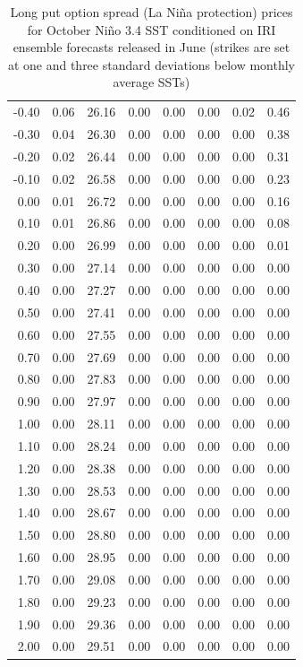 \documentclass[article]{jss}
\begin{document}
\begin{table}[!htbp]
\begin{tabular}{rrrrrrrr}
  -0.40 & 0.06 & 26.16 & 0.00 & 0.00 & 0.00 & 0.02 & 0.46 \\ 
  -0.30 & 0.04 & 26.30 & 0.00 & 0.00 & 0.00 & 0.00 & 0.38 \\ 
  -0.20 & 0.02 & 26.44 & 0.00 & 0.00 & 0.00 & 0.00 & 0.31 \\ 
  -0.10 & 0.02 & 26.58 & 0.00 & 0.00 & 0.00 & 0.00 & 0.23 \\ 
  0.00 & 0.01 & 26.72 & 0.00 & 0.00 & 0.00 & 0.00 & 0.16 \\ 
  0.10 & 0.01 & 26.86 & 0.00 & 0.00 & 0.00 & 0.00 & 0.08 \\ 
  0.20 & 0.00 & 26.99 & 0.00 & 0.00 & 0.00 & 0.00 & 0.01 \\ 
  0.30 & 0.00 & 27.14 & 0.00 & 0.00 & 0.00 & 0.00 & 0.00 \\ 
  0.40 & 0.00 & 27.27 & 0.00 & 0.00 & 0.00 & 0.00 & 0.00 \\ 
  0.50 & 0.00 & 27.41 & 0.00 & 0.00 & 0.00 & 0.00 & 0.00 \\ 
  0.60 & 0.00 & 27.55 & 0.00 & 0.00 & 0.00 & 0.00 & 0.00 \\ 
  0.70 & 0.00 & 27.69 & 0.00 & 0.00 & 0.00 & 0.00 & 0.00 \\ 
  0.80 & 0.00 & 27.83 & 0.00 & 0.00 & 0.00 & 0.00 & 0.00 \\ 
  0.90 & 0.00 & 27.97 & 0.00 & 0.00 & 0.00 & 0.00 & 0.00 \\ 
  1.00 & 0.00 & 28.11 & 0.00 & 0.00 & 0.00 & 0.00 & 0.00 \\ 
  1.10 & 0.00 & 28.24 & 0.00 & 0.00 & 0.00 & 0.00 & 0.00 \\ 
  1.20 & 0.00 & 28.38 & 0.00 & 0.00 & 0.00 & 0.00 & 0.00 \\ 
  1.30 & 0.00 & 28.53 & 0.00 & 0.00 & 0.00 & 0.00 & 0.00 \\ 
  1.40 & 0.00 & 28.67 & 0.00 & 0.00 & 0.00 & 0.00 & 0.00 \\ 
  1.50 & 0.00 & 28.80 & 0.00 & 0.00 & 0.00 & 0.00 & 0.00 \\ 
  1.60 & 0.00 & 28.95 & 0.00 & 0.00 & 0.00 & 0.00 & 0.00 \\ 
  1.70 & 0.00 & 29.08 & 0.00 & 0.00 & 0.00 & 0.00 & 0.00 \\ 
  1.80 & 0.00 & 29.23 & 0.00 & 0.00 & 0.00 & 0.00 & 0.00 \\ 
  1.90 & 0.00 & 29.36 & 0.00 & 0.00 & 0.00 & 0.00 & 0.00 \\ 
  2.00 & 0.00 & 29.51 & 0.00 & 0.00 & 0.00 & 0.00 & 0.00 \\ 
   \hline
\end{tabular}
\caption{Long put option spread (La Ni\~na protection) prices for October Ni\~no 3.4 SST conditioned on IRI ensemble forecasts released in June (strikes are set at one and three standard deviations below monthly average SSTs)} 
\label{tab:pricesOctSub}
\end{table}
\end{document}
